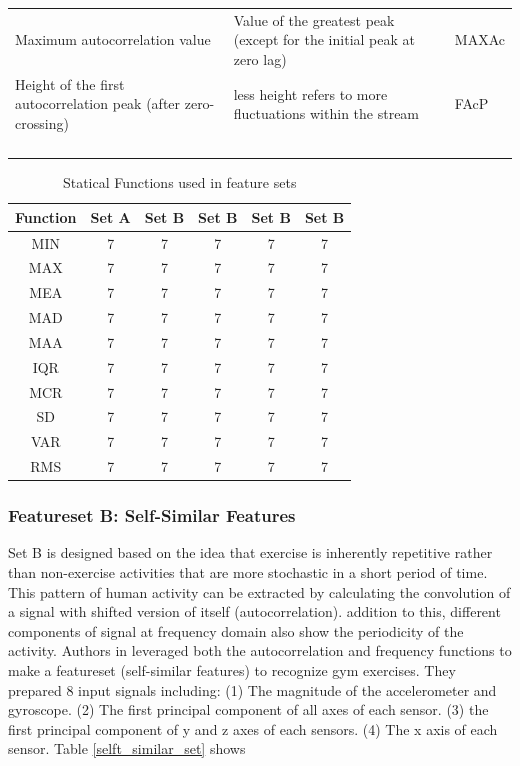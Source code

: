 \documentclass[journal,article,submit,moreauthors,pdftex]{Definitions/mdpi}
\begin{document}
\begin{table}[H]
\begin{tabular}{p{3.4cm}p{6cm}p{1.3cm}}
		Maximum autocorrelation value&{\scriptsize Value of the greatest peak (except for the initial peak at zero lag)} & MAXAc \\
		Height of the first autocorrelation peak (after zero-crossing)&{\scriptsize less height refers to more fluctuations within the stream  } & FAcP \\
		&{\scriptsize } & \\
		&{\scriptsize } & \\
		&{\scriptsize } & \\
		&{\scriptsize } & \\
		\bottomrule
	\end{tabular}
	\label{statistical_set}
\end{table}
\begin{table}[H]
	\caption{Statical Functions used in feature sets}
	\centering
	\begin{tabular}{cccccc}
		\toprule
		\textbf{Function} & \textbf{Set A} & \textbf{Set B}& \textbf{Set B}& \textbf{Set B}& \textbf{Set B}\\
		\midrule
		MIN & 7& 7& 7& 7& 7\\
		MAX& 7& 7& 7& 7& 7\\
		MEA& 7& 7& 7& 7& 7\\
		MAD& 7& 7& 7& 7& 7\\
		MAA& 7& 7& 7& 7& 7\\
		IQR  & 7& 7& 7& 7& 7 \\
		MCR& 7& 7& 7& 7& 7\\
		SD& 7& 7& 7& 7& 7\\
		VAR& 7& 7& 7& 7& 7\\
		RMS& 7& 7& 7& 7& 7\\
		\bottomrule
	\end{tabular}
	\label{statistical_set}
\end{table}
\subsubsection{Featureset B: Self-Similar Features}
Set B is designed based on the idea that exercise is inherently repetitive rather than non-exercise activities that are more stochastic in a short period of time. This pattern of human activity can be extracted by calculating the convolution of a signal with shifted version of itself (autocorrelation). addition to this, different components of signal at frequency domain also show the periodicity of the activity. Authors in \cite{morris2014recofit} leveraged both the autocorrelation and frequency functions to make a featureset (self-similar features) to recognize gym exercises. They prepared 8 input signals including: (1) The magnitude of the accelerometer and gyroscope. (2) The first principal component of all axes of each sensor. (3) the first principal component of y and z axes of each sensors. (4) The x axis of each sensor. Table \ref{selft_similar_set} shows 
\end{document}

